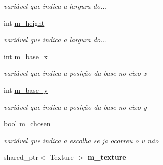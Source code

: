 \begin{DoxyCompactItemize}
\begin{DoxyCompactList}\small\item\em variável que indica a largura do... \end{DoxyCompactList}\item 
\mbox{\label{classCharacterSelection_a70832b1668915aa4a91d4ac5eea5fed1}} 
int \mbox{\hyperlink{classCharacterSelection_a70832b1668915aa4a91d4ac5eea5fed1}{m\+\_\+height}}
\begin{DoxyCompactList}\small\item\em variável que indica a largura do... \end{DoxyCompactList}\item 
\mbox{\label{classCharacterSelection_aeb7a11351418002b57587f6abed12a00}} 
int \mbox{\hyperlink{classCharacterSelection_aeb7a11351418002b57587f6abed12a00}{m\+\_\+base\+\_\+x}}
\begin{DoxyCompactList}\small\item\em variável que indica a posição da base no eixo x \end{DoxyCompactList}\item 
\mbox{\label{classCharacterSelection_a09610c3c8cca5a24ba210131aaa4b1c8}} 
int \mbox{\hyperlink{classCharacterSelection_a09610c3c8cca5a24ba210131aaa4b1c8}{m\+\_\+base\+\_\+y}}
\begin{DoxyCompactList}\small\item\em variável que indica a posição da base no eixo y \end{DoxyCompactList}\item 
\mbox{\label{classCharacterSelection_aadc3d49c3cee49de9b3c886cac52897e}} 
bool \mbox{\hyperlink{classCharacterSelection_aadc3d49c3cee49de9b3c886cac52897e}{m\+\_\+chosen}}
\begin{DoxyCompactList}\small\item\em variável que indica a escolha se ja ocorreu o u não \end{DoxyCompactList}\item 
\mbox{\label{classCharacterSelection_a31044c8efa146c6b1d19daf355645901}} 
shared\+\_\+ptr$<$ Texture $>$ {\bfseries m\+\_\+texture}
\end{DoxyCompactItemize}


